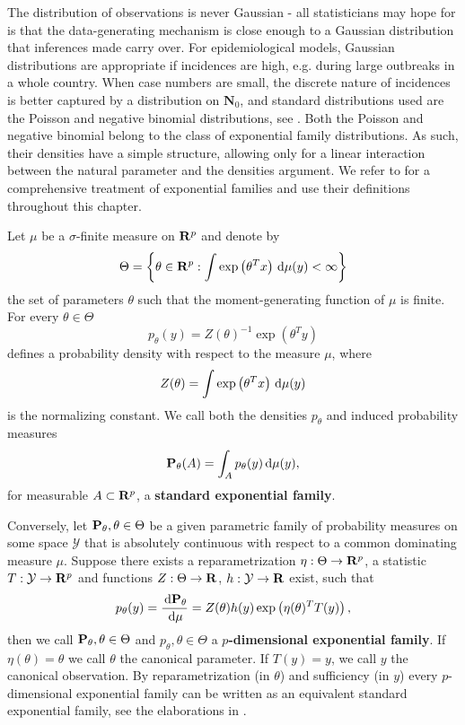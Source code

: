 The distribution of observations is never Gaussian - all statisticians may hope for is that the data-generating mechanism is close enough to a Gaussian distribution that inferences made carry over.
For epidemiological models, Gaussian distributions are appropriate if incidences are high, e.g. during large outbreaks in a whole country. 
When case numbers are small, the discrete nature of incidences is better captured by a distribution on $\mathbf N_{0}$, and standard distributions used are the Poisson and negative binomial distributions, see .
Both the Poisson and negative binomial belong to the class of exponential family distributions. As such, their densities have a simple structure, allowing only for a linear interaction between the natural parameter and the densities argument. We refer to \cite{Brown1986Fundamentals} for a comprehensive treatment of exponential families and use their definitions throughout this chapter.

\begin{definition}
    Let $\mu$ be a $\sigma$-finite measure on $\R^{p}$ and denote by 
    $$\Theta = \left\{\theta \in \R^{p} : \int \exp \left( \theta^{T} x \right) \d\mu(y) < \infty\right\}$$
    the set of parameters $\theta$ such that the moment-generating function of $\mu$ is finite. 
    For every $\theta \in \Theta$ $$p_{\theta}(y) = Z(\theta)^{-1} \exp (\theta^{T} y)$$ defines a probability density with respect to the measure $\mu$, where $$Z(\theta) = \int \exp \left( \theta^{T} x \right) \d\mu(y)$$ is the normalizing constant. 
    We call both the densities $p_{\theta}$ and induced probability measures $$ \P_{\theta} (A) = \int_{A} p_{\theta}(y) \d \mu(y),$$ for measurable $A \subset \R^{p}$, a \textbf{standard exponential family}.

    Conversely, let $\P_{\theta}, \theta \in \Theta$ be a given parametric family of probability measures on some space $\mathcal Y$ that is absolutely continuous with respect to a common dominating measure $\mu$. Suppose there exists a reparametrization $\eta : \Theta \to \R^{p}$, a statistic $T: \mathcal Y \to \R^{p}$ and functions $Z: \Theta\to \R$, $h:\mathcal Y \to \R$ exist, such that
    $$
        p_{\theta}(y) = \frac{\d \P_{\theta}}{\d \mu} = Z(\theta) h(y) \exp \left(\eta(\theta)^{T}T(y)\right),
    $$
    then we call $\P_{\theta}, \theta \in \Theta$ and $p_{\theta}, \theta \in \Theta$ a \textbf{$p$-dimensional exponential family}. If $\eta(\theta) = \theta$ we call $\theta$ the canonical parameter. If $T(y) = y$, we call $y$ the canonical observation. By reparametrization (in $\theta$) and sufficiency (in $y$) every $p$-dimensional exponential family can be written as an equivalent standard exponential family, see the elaborations in \cite[Chapter 1]{Brown1986Fundamentals}.
\end{definition}

